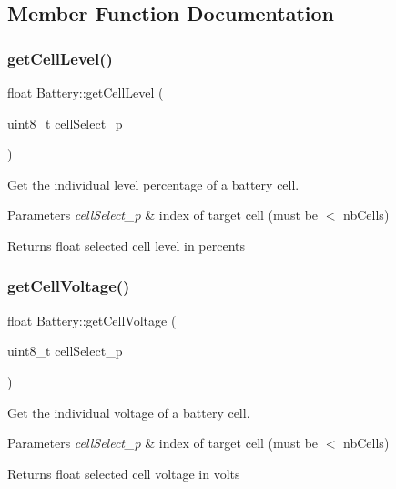 \subsection{Member Function Documentation}
\mbox{\label{class_battery_a810c22577141039b044fdf59a9f9bdef}} 
\subsubsection{\texorpdfstring{get\+Cell\+Level()}{getCellLevel()}}
{\footnotesize\ttfamily float Battery\+::get\+Cell\+Level (\begin{DoxyParamCaption}\item[{uint8\+\_\+t}]{cell\+Select\+\_\+p }\end{DoxyParamCaption})}



Get the individual level percentage of a battery cell. 


\begin{DoxyParams}{Parameters}
{\em cell\+Select\+\_\+p} & index of target cell (must be $<$ nb\+Cells) \\
\hline
\end{DoxyParams}
\begin{DoxyReturn}{Returns}
float selected cell level in percents 
\end{DoxyReturn}
\mbox{\label{class_battery_ae449209593f825ca7cefc958d51ba232}} 
\subsubsection{\texorpdfstring{get\+Cell\+Voltage()}{getCellVoltage()}}
{\footnotesize\ttfamily float Battery\+::get\+Cell\+Voltage (\begin{DoxyParamCaption}\item[{uint8\+\_\+t}]{cell\+Select\+\_\+p }\end{DoxyParamCaption})}



Get the individual voltage of a battery cell. 


\begin{DoxyParams}{Parameters}
{\em cell\+Select\+\_\+p} & index of target cell (must be $<$ nb\+Cells) \\
\hline
\end{DoxyParams}
\begin{DoxyReturn}{Returns}
float selected cell voltage in volts 
\end{DoxyReturn}
\mbox{\label{class_battery_a16e5bfb8a07ce93c08382fbcfb0b19be}} 
